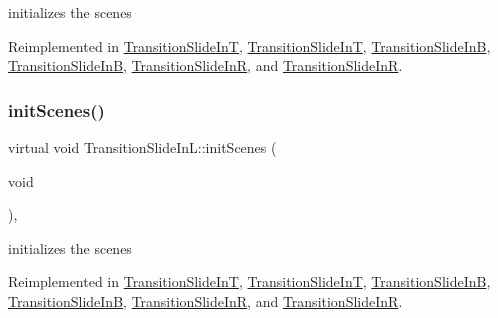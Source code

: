 initializes the scenes 

Reimplemented in \hyperlink{classTransitionSlideInT_a974e6dd9c9fe6159497bf3196e383a43}{Transition\+Slide\+InT}, \hyperlink{classTransitionSlideInT_a3bd7d1724466523acee846e73e42f7d2}{Transition\+Slide\+InT}, \hyperlink{classTransitionSlideInB_afd38bcea49403ae2b80cd069f46d399c}{Transition\+Slide\+InB}, \hyperlink{classTransitionSlideInB_abe143990b357e249716a54e72249ac96}{Transition\+Slide\+InB}, \hyperlink{classTransitionSlideInR_a52d4ea6804532c5e6bc36400f6e907a6}{Transition\+Slide\+InR}, and \hyperlink{classTransitionSlideInR_a7fde5b3340ce2bd108d6382e0fd1a44f}{Transition\+Slide\+InR}.

\mbox{\label{classTransitionSlideInL_af16fe2f52258fe7a9a6516ba359d0c42}} 
\subsubsection{\texorpdfstring{init\+Scenes()}{initScenes()}\hspace{0.1cm}{\footnotesize\ttfamily [2/2]}}
{\footnotesize\ttfamily virtual void Transition\+Slide\+In\+L\+::init\+Scenes (\begin{DoxyParamCaption}\item[{void}]{ }\end{DoxyParamCaption})\hspace{0.3cm}{\ttfamily [protected]}, {\ttfamily [virtual]}}

initializes the scenes 

Reimplemented in \hyperlink{classTransitionSlideInT_a974e6dd9c9fe6159497bf3196e383a43}{Transition\+Slide\+InT}, \hyperlink{classTransitionSlideInT_a3bd7d1724466523acee846e73e42f7d2}{Transition\+Slide\+InT}, \hyperlink{classTransitionSlideInB_afd38bcea49403ae2b80cd069f46d399c}{Transition\+Slide\+InB}, \hyperlink{classTransitionSlideInB_abe143990b357e249716a54e72249ac96}{Transition\+Slide\+InB}, \hyperlink{classTransitionSlideInR_a52d4ea6804532c5e6bc36400f6e907a6}{Transition\+Slide\+InR}, and \hyperlink{classTransitionSlideInR_a7fde5b3340ce2bd108d6382e0fd1a44f}{Transition\+Slide\+InR}.

\mbox{\label{classTransitionSlideInL_a6dcdddd697019eb9907e6df4a205da98}} 
